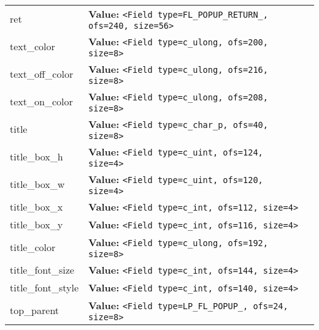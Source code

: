 \begin{longtable}{|p{\varnamewidth}|p{\vardescrwidth}|l}
\cline{1-2}
\raggedright r\-e\-t\- & \raggedright \textbf{Value:} 
{\tt {\textless}Field type=FL\_POPUP\_RETURN\_, ofs=240, size=56{\textgreater}}&\\
\cline{1-2}
\raggedright t\-e\-x\-t\-\_\-c\-o\-l\-o\-r\- & \raggedright \textbf{Value:} 
{\tt {\textless}Field type=c\_ulong, ofs=200, size=8{\textgreater}}&\\
\cline{1-2}
\raggedright t\-e\-x\-t\-\_\-o\-f\-f\-\_\-c\-o\-l\-o\-r\- & \raggedright \textbf{Value:} 
{\tt {\textless}Field type=c\_ulong, ofs=216, size=8{\textgreater}}&\\
\cline{1-2}
\raggedright t\-e\-x\-t\-\_\-o\-n\-\_\-c\-o\-l\-o\-r\- & \raggedright \textbf{Value:} 
{\tt {\textless}Field type=c\_ulong, ofs=208, size=8{\textgreater}}&\\
\cline{1-2}
\raggedright t\-i\-t\-l\-e\- & \raggedright \textbf{Value:} 
{\tt {\textless}Field type=c\_char\_p, ofs=40, size=8{\textgreater}}&\\
\cline{1-2}
\raggedright t\-i\-t\-l\-e\-\_\-b\-o\-x\-\_\-h\- & \raggedright \textbf{Value:} 
{\tt {\textless}Field type=c\_uint, ofs=124, size=4{\textgreater}}&\\
\cline{1-2}
\raggedright t\-i\-t\-l\-e\-\_\-b\-o\-x\-\_\-w\- & \raggedright \textbf{Value:} 
{\tt {\textless}Field type=c\_uint, ofs=120, size=4{\textgreater}}&\\
\cline{1-2}
\raggedright t\-i\-t\-l\-e\-\_\-b\-o\-x\-\_\-x\- & \raggedright \textbf{Value:} 
{\tt {\textless}Field type=c\_int, ofs=112, size=4{\textgreater}}&\\
\cline{1-2}
\raggedright t\-i\-t\-l\-e\-\_\-b\-o\-x\-\_\-y\- & \raggedright \textbf{Value:} 
{\tt {\textless}Field type=c\_int, ofs=116, size=4{\textgreater}}&\\
\cline{1-2}
\raggedright t\-i\-t\-l\-e\-\_\-c\-o\-l\-o\-r\- & \raggedright \textbf{Value:} 
{\tt {\textless}Field type=c\_ulong, ofs=192, size=8{\textgreater}}&\\
\cline{1-2}
\raggedright t\-i\-t\-l\-e\-\_\-f\-o\-n\-t\-\_\-s\-i\-z\-e\- & \raggedright \textbf{Value:} 
{\tt {\textless}Field type=c\_int, ofs=144, size=4{\textgreater}}&\\
\cline{1-2}
\raggedright t\-i\-t\-l\-e\-\_\-f\-o\-n\-t\-\_\-s\-t\-y\-l\-e\- & \raggedright \textbf{Value:} 
{\tt {\textless}Field type=c\_int, ofs=140, size=4{\textgreater}}&\\
\cline{1-2}
\raggedright t\-o\-p\-\_\-p\-a\-r\-e\-n\-t\- & \raggedright \textbf{Value:} 
{\tt {\textless}Field type=LP\_FL\_POPUP\_, ofs=24, size=8{\textgreater}}&\\

\end{longtable}
